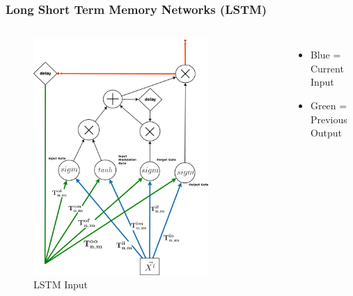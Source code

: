 \documentclass{beamer}
\begin{document}
\begin{frame}
\frametitle{Long Short Term Memory Networks (LSTM)}
\begin{columns}
\begin{figure}[t!]
    \centering
    \includegraphics[width=0.8\textwidth]{./pictures/figures/LSTM_input.png}
    \caption{LSTM Input}
    \label{fig:LSTM_input}
\end{figure}

\begin{itemize}
\item Blue = Current Input
\item Green = Previous Output
\end{itemize}
\end{columns}
\end{frame}
\end{document}
